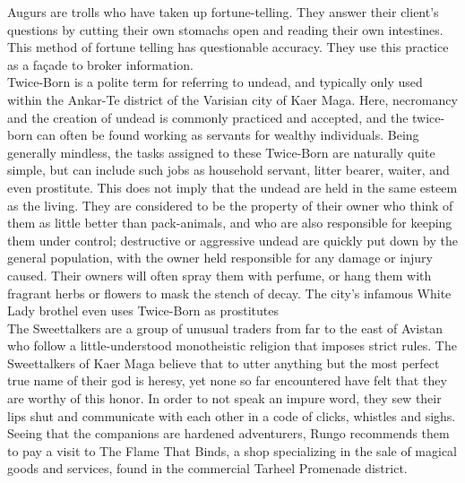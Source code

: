 Augurs are trolls who have taken up fortune-telling. They answer their client's questions by cutting their own stomachs open and reading their own intestines. This method of fortune telling has questionable accuracy. They use this practice as a fa\c{c}ade to broker information.\\

Twice-Born is a polite term for referring to undead, and typically only used within the Ankar-Te district of the Varisian city of Kaer Maga. Here, necromancy and the creation of undead is commonly practiced and accepted, and the twice-born can often be found working as servants for wealthy individuals. Being generally mindless, the tasks assigned to these Twice-Born are naturally quite simple, but can include such jobs as household servant, litter bearer, waiter, and even prostitute. This does not imply that the undead are held in the same esteem as the living. They are considered to be the property of their owner who think of them as little better than pack-animals, and who are also responsible for keeping them under control; destructive or aggressive undead are quickly put down by the general population, with the owner held responsible for any damage or injury caused. Their owners will often spray them with perfume, or hang them with fragrant herbs or flowers to mask the stench of decay. The city's infamous White Lady brothel even uses Twice-Born as prostitutes\\

The Sweettalkers are a group of unusual traders from far to the east of Avistan who follow a little-understood monotheistic religion that imposes strict rules. The Sweettalkers of Kaer Maga believe that to utter anything but the most perfect true name of their god is heresy, yet none so far encountered have felt that they are worthy of this honor. In order to not speak an impure word, they sew their lips shut and communicate with each other in a code of clicks, whistles and sighs.\\

Seeing that the companions are hardened adventurers, Rungo recommends them to pay a visit to The Flame That Binds, a shop specializing in the sale of magical goods and services, found in the commercial Tarheel Promenade district.\\

